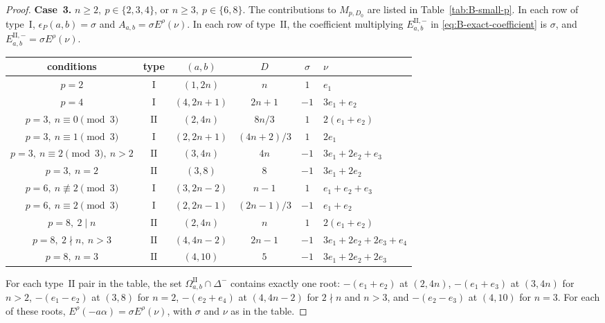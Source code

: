 \documentclass[11pt,a4paper]{amsart}
\theoremstyle{plain}
\numberwithin{equation}{section}
\newenvironment{pf}{\begin{proof}}{\end{proof}}
\begin{document}
\begin{pf}
	\noindent\textbf{Case~3.} \(n\ge2,\ p\in\{2,3,4\}\), or \(n\ge3,\ p\in\{6,8\}\).
	The contributions to \(M_{p,D_0}\) are listed in Table~\ref{tab:B-small-p}. In each row of type~\(\mathrm I\),
	\(\epsilon_P(a,b)=\sigma\) and
	\(A_{a,b}=\sigma E^\rho(\nu)\).
	In each row of type~\(\mathrm{II}\), the coefficient multiplying
	\(E_{a,b}^{\mathrm{II},-}\) in \eqref{eq:B-exact-coefficient}
	is \(\sigma\), and
	\(E_{a,b}^{\mathrm{II},-}=\sigma E^\rho(\nu)\).
	\begin{center}
\label{tab:B-small-p}
		\small
		\begin{adjustbox}{max width=\textwidth}
			\begin{tabular}{c|c|c|c|c|l}
				conditions & type & \((a,b)\) & \(D\) & \(\sigma\) & \(\nu\)\\ \hline
				\(p=2\)&\(\mathrm I\)&\((1,2n)\)&\(n\)&\(1\)&\(e_1\)\\
				\(p=4\)&\(\mathrm I\)&\((4,2n+1)\)&\(2n+1\)&\(-1\)&\(3e_1+e_2\)\\
				\(p=3,\ n\equiv0\pmod3\)&\(\mathrm{II}\)&\((2,4n)\)&\(8n/3\)&\(1\)&\(2(e_1+e_2)\)\\
				\(p=3,\ n\equiv1\pmod3\)&\(\mathrm I\)&\((2,2n+1)\)&\((4n+2)/3\)&\(1\)&\(2e_1\)\\
				\(p=3,\ n\equiv2\pmod3,\ n>2\)&\(\mathrm{II}\)&\((3,4n)\)&\(4n\)&\(-1\)&\(3e_1+2e_2+e_3\)\\
				\(p=3,\ n=2\)&\(\mathrm{II}\)&\((3,8)\)&\(8\)&\(-1\)&\(3e_1+2e_2\)\\
				\(p=6,\ n\not\equiv2\pmod3\)&\(\mathrm I\)&\((3,2n-2)\)&\(n-1\)&\(1\)&\(e_1+e_2+e_3\)\\
				\(p=6,\ n\equiv2\pmod3\)&\(\mathrm I\)&\((2,2n-1)\)&\((2n-1)/3\)&\(-1\)&\(e_1+e_2\)\\
				\(p=8,\ 2\mid n\)&\(\mathrm{II}\)&\((2,4n)\)&\(n\)&\(1\)&\(2(e_1+e_2)\)\\
				\(p=8,\ 2\nmid n,\ n>3\)&\(\mathrm{II}\)&\((4,4n-2)\)&\(2n-1\)&\(-1\)&\(3e_1+2e_2+2e_3+e_4\)\\
				\(p=8,\ n=3\)&\(\mathrm{II}\)&\((4,10)\)&\(5\)&\(-1\)&\(3e_1+2e_2+2e_3\)
			\end{tabular}
		\end{adjustbox}
	\end{center}
	For each type~\(\mathrm{II}\) pair in the table, the set
	\(\Omega_{a,b}^{\mathrm{II}}\cap\Delta^-\) contains exactly one root:
	\(-(e_1+e_2)\) at \((2,4n)\),
	\(-(e_1+e_3)\) at \((3,4n)\) for \(n>2\),
	\(-(e_1-e_2)\) at \((3,8)\) for \(n=2\),
	\(-(e_2+e_4)\) at \((4,4n-2)\) for \(2\nmid n\) and \(n>3\), and
	\(-(e_2-e_3)\) at \((4,10)\) for \(n=3\).
	For each of these roots, \(E^\rho(-a\alpha)=\sigma E^\rho(\nu)\),
	with \(\sigma\) and \(\nu\) as in the table.
	

\end{pf}
\end{document}
